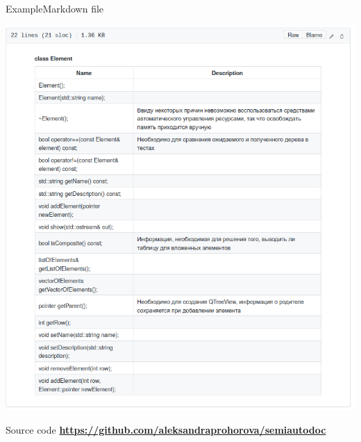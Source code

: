 \documentclass{beamer}
\begin{document}
\begin{frame}
{Example}{Markdown file}

\includegraphics[scale = 0.4]{markdown.png}

\end{frame}


\begin{frame}
{Source code}
\href{https://github.com/aleksandraprohorova/semiautodoc}{\textbf{https://github.com/aleksandraprohorova/semiautodoc}}\\
\end{frame}
\end{document}
